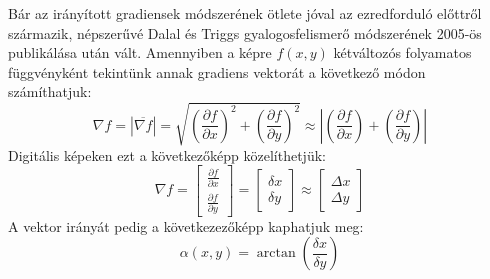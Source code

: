 Bár az irányított gradiensek módszerének ötlete jóval az ezredforduló előttről származik\cite{william_t_freeman_orientation_1994,mcconnell_method_1986}, népszerűvé Dalal és Triggs\cite{dalal_histograms_2005} gyalogosfelismerő módszerének 2005-ös publikálása után vált. Amennyiben a képre \(f(x, y)\) kétváltozós folyamatos függvényként tekintünk annak gradiens vektorát a következő módon számíthatjuk:
\begin{equation}
    \nabla f = |\overline{\nabla f}| = \sqrt{\left(\frac{\partial f}{\partial x}\right)^2 + \left(\frac{\partial f}{\partial y}\right)^2} \approx \left| \left(\frac{\partial f}{\partial x}\right) + \left(\frac{\partial f}{\partial y}\right) \right|
\end{equation}
Digitális képeken ezt a következőképp közelíthetjük:
\begin{equation}
    \nabla f = 
    \begin{bmatrix}
        \frac{\partial f}{\partial x} \\
        \frac{\partial f}{\partial y}
    \end{bmatrix}
    =
    \begin{bmatrix}
        \delta x \\
        \delta y
    \end{bmatrix}
    \approx
    \begin{bmatrix}
        \Delta x \\
        \Delta y
    \end{bmatrix}
\end{equation}
A vektor irányát pedig a következezőképp kaphatjuk meg:
\begin{equation}
    \alpha (x,y) = \arctan \left(\frac{\delta x}{\delta y}\right)
\end{equation}

